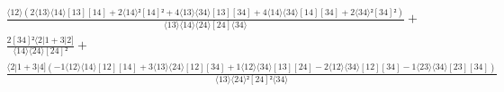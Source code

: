 \documentclass[varwidth, border=5pt]{standalone}
\begin{document}
\begin{my}
$\begin{gathered}
\scriptscriptstyle\frac{⟨12⟩(2⟨13⟩⟨14⟩[13][14]+2⟨14⟩²[14]²+4⟨13⟩⟨34⟩[13][34]+4⟨14⟩⟨34⟩[14][34]+2⟨34⟩²[34]²)}{⟨13⟩⟨14⟩⟨24⟩[24]⟨34⟩} +\\
\scriptscriptstyle\frac{2[34]²⟨2|1+3|2]}{⟨14⟩⟨24⟩[24]²} +\\
\scriptscriptstyle\frac{⟨2|1+3|4](-1⟨12⟩⟨14⟩[12][14]+3⟨13⟩⟨24⟩[12][34]+1⟨12⟩⟨34⟩[13][24]-2⟨12⟩⟨34⟩[12][34]-1⟨23⟩⟨34⟩[23][34])}{⟨13⟩⟨24⟩²[24]²⟨34⟩} \phantom{+}
\end{gathered}$
\end{my}
\end{document}
